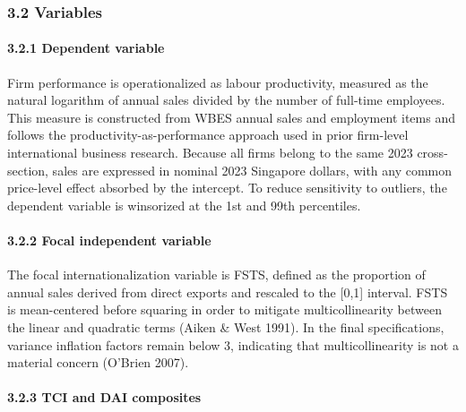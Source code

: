 \documentclass[12pt,a4paper]{article}
\begin{document}
\hypertarget{32-variables}{%
\subsubsection{3.2 Variables}\label{32-variables}}

\hypertarget{321-dependent-variable}{%
\paragraph{3.2.1 Dependent variable}\label{321-dependent-variable}}

Firm performance is operationalized as labour productivity, measured as
the natural logarithm of annual sales divided by the number of full-time
employees. This measure is constructed from WBES annual sales and
employment items and follows the productivity-as-performance approach
used in prior firm-level international business research. Because all
firms belong to the same 2023 cross-section, sales are expressed in
nominal 2023 Singapore dollars, with any common price-level effect
absorbed by the intercept. To reduce sensitivity to outliers, the
dependent variable is winsorized at the 1st and 99th percentiles.

\hypertarget{322-focal-independent-variable}{%
\paragraph{3.2.2 Focal independent
variable}\label{322-focal-independent-variable}}

The focal internationalization variable is FSTS, defined as the
proportion of annual sales derived from direct exports and rescaled to
the {[}0,1{]} interval. FSTS is mean-centered before squaring in order
to mitigate multicollinearity between the linear and quadratic terms
(Aiken \& West 1991). In the final specifications, variance inflation
factors remain below 3, indicating that multicollinearity is not a
material concern (O'Brien 2007).

\hypertarget{323-tci-and-dai-composites}{%
\paragraph{3.2.3 TCI and DAI
composites}\label{323-tci-and-dai-composites}}
\end{document}
